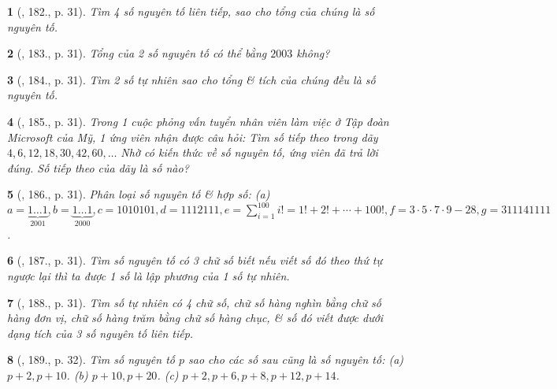 \documentclass{article}
\newtheorem{baitoan}{}
\begin{document}
\begin{baitoan}[\cite{Binh_Toan_6_tap_1}, 182., p. 31]
	Tìm 4 số nguyên tố liên tiếp, sao cho tổng của chúng là số nguyên tố.
\end{baitoan}

\begin{baitoan}[\cite{Binh_Toan_6_tap_1}, 183., p. 31]
	Tổng của 2 số nguyên tố có thể bằng $2003$ không?
\end{baitoan}

\begin{baitoan}[\cite{Binh_Toan_6_tap_1}, 184., p. 31]
	Tìm 2 số tự nhiên sao cho tổng \& tích của chúng đều là số nguyên tố.
\end{baitoan}

\begin{baitoan}[\cite{Binh_Toan_6_tap_1}, 185., p. 31]
	Trong 1 cuộc phỏng vấn tuyển nhân viên làm việc ở Tập đoàn Microsoft của Mỹ, 1 ứng viên nhận được câu hỏi: Tìm số tiếp theo trong dãy $4,6,12,18,30,42,60,\ldots$ Nhờ có kiến thức về số nguyên tố, ứng viên đã trả lời đúng. Số tiếp theo của dãy là số nào?
\end{baitoan}

\begin{baitoan}[\cite{Binh_Toan_6_tap_1}, 186., p. 31]
	Phân loại số nguyên tố \& hợp số: (a) $a = \underbrace{1\ldots1}_{2001}, b = \underbrace{1\ldots1}_{2000}, c = 1010101, d = 1112111, e = \sum_{i=1}^{100} i! = 1! + 2! + \cdots + 100!, f = 3\cdot5\cdot7\cdot9 - 28, g = 311141111$.
\end{baitoan}

\begin{baitoan}[\cite{Binh_Toan_6_tap_1}, 187., p. 31]
	Tìm số nguyên tố có 3 chữ số biết nếu viết số đó theo thứ tự ngược lại thì ta được 1 số là lập phương của 1 số tự nhiên.
\end{baitoan}

\begin{baitoan}[\cite{Binh_Toan_6_tap_1}, 188., p. 31]
	Tìm số tự nhiên có 4 chữ số, chữ số hàng nghìn bằng chữ số hàng đơn vị, chữ số hàng trăm bằng chữ số hàng chục, \& số đó viết được dưới dạng tích của 3 số nguyên tố liên tiếp.
\end{baitoan}

\begin{baitoan}[\cite{Binh_Toan_6_tap_1}, 189., p. 32]
	Tìm số nguyên tố $p$ sao cho các số sau cũng là số nguyên tố: (a) $p + 2,p + 10$. (b) $p + 10,p + 20$. (c) $p + 2,p + 6,p + 8,p + 12,p + 14$.
\end{baitoan}
\end{document}
